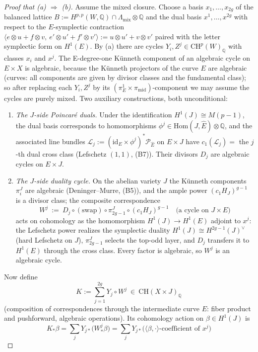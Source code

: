 \documentclass[11pt]{article}
\newcommand{\Q}{\mathbb{Q}}
\newcommand{\CH}{\mathrm{CH}}
\newcommand{\Hom}{\mathrm{Hom}}
\begin{document}
\begin{proof}[Proof that (a) $\Rightarrow$ (b)]
Assume the mixed closure. Choose a basis $x_1,\dots,x_{2g}$ of the balanced
lattice $B:=H^{p,p}(W,\Q)\cap\Lambda_{\mathrm{mix}}\otimes\Q$ and the dual
basis $x^1,\dots,x^{2g}$ with respect to the $E$-symplectic contraction
$\langle e\otimes u+f\otimes v,\ e'\otimes u'+f'\otimes v'\rangle
:=u\otimes u'+v\otimes v'$ paired with the letter symplectic form on
$H^1(E)$. By (a) there are cycles $Y_i,Z^j\in\CH^p(W)_\Q$ with classes $x_i$
and $x^j$. The E-degree-one K\"unneth component of an algebraic cycle on
$E\times X$ is algebraic, because the K\"unneth projectors of the curve $E$
are algebraic (curves: all components are given by divisor classes and the
fundamental class); so after replacing each $Y_i,Z^j$ by its
$(\pi^1_E\times\pi_{\mathrm{mid}})$-component we may assume the cycles are
purely mixed. Two auxiliary constructions, both unconditional:
\begin{enumerate}[label=(A\arabic*)]
\item \emph{The $J$-side Poincar\'e duals.} Under the identification
$H^1(J)\cong M(p-1)$, the dual basis corresponds to homomorphisms
$\phi^j\in\Hom(J,\hat E)\otimes\Q$, and the associated line bundles
$\mathcal L_j:=(\mathrm{id}_E\times\phi^j)^*\mathcal P_{\hat E}$ on $E\times J$
have $c_1(\mathcal L_j)=$ the $j$-th dual cross class (Lefschetz $(1,1)$,
(B7)). Their divisors $D_j$ are algebraic cycles on $E\times J$.
\item \emph{The $J$-side duality cycle.} On the abelian variety $J$ the
K\"unneth components $\pi^J_i$ are algebraic (Deninger--Murre, (B5)), and the
ample power $(c_1H_J)^{g-1}$ is a divisor class; the composite correspondence
\[
W^j\ :=\ D_j\circ(\mathrm{swap})\circ\pi^J_{2g-1}\circ(c_1H_J)^{g-1}
\quad\text{(a cycle on }J\times E\text{)}
\]
acts on cohomology as the homomorphism $H^1(J)\to H^1(E)$ adjoint to
$x^j$: the Lefschetz power realizes the symplectic duality
$H^1(J)\cong H^{2g-1}(J)^\vee$ (hard Lefschetz on $J$), $\pi^J_{2g-1}$
selects the top-odd layer, and $D_j$ transfers it to $H^1(E)$ through the
cross class. Every factor is algebraic, so $W^j$ is an algebraic cycle.
\end{enumerate}
Now define
\[
K:=\sum_{j=1}^{2g} Y_j\circ W^j\ \in\ \CH(X\times J)_\Q
\]
(composition of correspondences through the intermediate curve $E$: fiber
product and pushforward, algebraic operations). Its cohomology action on
$\beta\in H^1(J)$ is
\[
K_*\beta=\sum_j Y_{j*}\big(W^j_*\beta\big)
=\sum_j Y_{j*}\big(\langle\beta,\cdot\rangle\text{-coefficient of }x^j\big)
\]
\end{proof}
\end{document}
